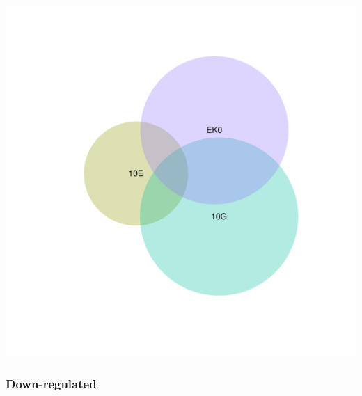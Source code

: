 \documentclass{article}\usepackage[]{graphicx}\usepackage[]{color}
\newenvironment{knitrout}{}{} %
\begin{document}
\begin{knitrout}
\color{fgcolor}

{\centering \includegraphics[width=1\linewidth,height=.4\textheight]{figure/minimal-venn_alltimes_3fc_up_euler-1} 

}



\end{knitrout}
\clearpage
\subsubsection{Down-regulated}
\end{document}
